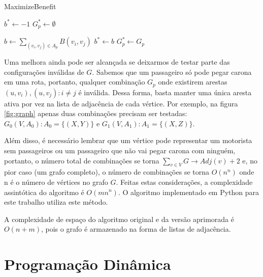 \documentclass{article}
\begin{document}
\begin{algorithm}
\caption{MaximizeBenefit}\label{euclid}
\begin{algorithmic}[1]

\State $ b^* \gets -1 $
\State $ G_p^* \gets \emptyset $
\item {}

  \State $ \textit{b} \gets \sum_{(v_i, v_j) \in A_p} B(v_i, v_j) $
    \State $ b^* \gets b $
    \State $ G_p^* \gets G_p $
  \EndIf
\EndIf
\EndFor
\EndProcedure
\end{algorithmic}
\label{alg:alg_1}
\end{algorithm}

Uma melhora ainda pode ser alcançada se deixarmos de testar parte das configurações inválidas de $ G $. Sabemos que 
um passageiro só pode pegar carona em uma rota, portanto, qualquer combinação $ G_p $ onde existirem arestas $ (u, v_i), (u, v_j) : i \neq j $
é inválida. Dessa forma, basta manter uma única aresta ativa por vez na lista de adjacência de cada vértice. Por exemplo, na figura \ref{fig:graph} apenas 
duas combinações precisam ser testadas: $ G_0(V,A_0) : A_0 = \{(X,Y)\} $ e $ G_1(V,A_1) : A_1 = \{(X,Z)\} $.

Além disso, é necessário lembrar que um vértice pode representar um motorista sem passageiros ou um passageiro que não vai pegar carona com ninguém, 
portanto, o número total de combinações 
se torna $ \sum_{v \in V} G \rightarrow Adj(v) + 2 $ e, no pior caso (um grafo completo), o número de combinações se torna $ O(n^n) $ 
onde n é o número de vértices no grafo $ G $. Feitas estas considerações, a complexidade assintótica do algoritmo é $ O(mn^n) $.
O algoritmo implementado em Python para este trabalho utiliza este método.

A complexidade de espaço do algoritmo original e da versão aprimorada é $ O(n + m) $, pois o grafo é armazenado na forma de listas de adjacência.

\section{Programação Dinâmica}
\end{document}
